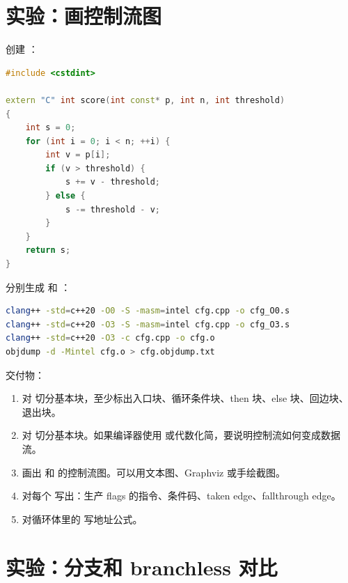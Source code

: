 \section{实验：画控制流图}

\begin{labbox}
创建 ：

\begin{lstlisting}[language=C++]
#include <cstdint>

extern "C" int score(int const* p, int n, int threshold)
{
    int s = 0;
    for (int i = 0; i < n; ++i) {
        int v = p[i];
        if (v > threshold) {
            s += v - threshold;
        } else {
            s -= threshold - v;
        }
    }
    return s;
}
\end{lstlisting}

分别生成  和 ：

\begin{lstlisting}[language=bash]
clang++ -std=c++20 -O0 -S -masm=intel cfg.cpp -o cfg_O0.s
clang++ -std=c++20 -O3 -S -masm=intel cfg.cpp -o cfg_O3.s
clang++ -std=c++20 -O3 -c cfg.cpp -o cfg.o
objdump -d -Mintel cfg.o > cfg.objdump.txt
\end{lstlisting}

交付物：

\begin{enumerate}
  \item 对  切分基本块，至少标出入口块、循环条件块、then 块、else 块、回边块、退出块。
  \item 对  切分基本块。如果编译器使用  或代数化简，要说明控制流如何变成数据流。
  \item 画出  和  的控制流图。可以用文本图、Graphviz 或手绘截图。
  \item 对每个  写出：生产 flags 的指令、条件码、taken edge、fallthrough edge。
  \item 对循环体里的  写地址公式。
\end{enumerate}
\end{labbox}

\section{实验：分支和 branchless 对比}


